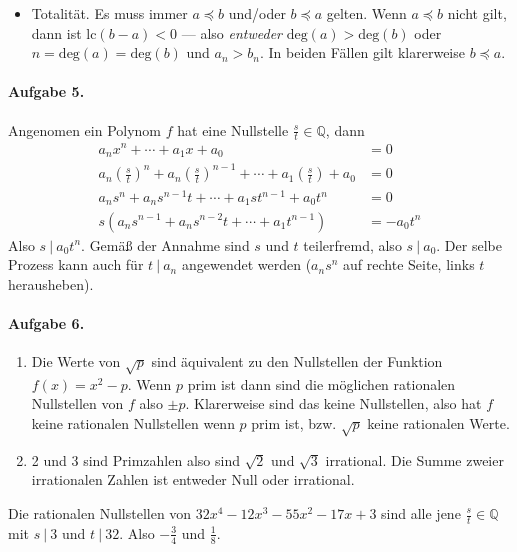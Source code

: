 \documentclass{article}
\begin{document}
\begin{enumerate}
\begin{itemize}
        \item Totalität. Es muss immer $a \preccurlyeq b$ und/oder $b \preccurlyeq a$ gelten. Wenn $a \preccurlyeq b$ nicht gilt, dann ist $\text{lc}(b - a) < 0$ --- also \emph{entweder} $\text{deg}(a) > \text{deg}(b)$ oder $n = \text{deg}(a) = \text{deg}(b)$ und $a_n > b_n$. In beiden Fällen gilt klarerweise $b \preccurlyeq a$.
    \end{itemize}
\end{enumerate}

\paragraph{Aufgabe 5.} Angenomen ein Polynom $f$ hat eine Nullstelle $\frac{s}{t} \in \mathbb{Q}$, dann
\begin{align*}
    a_nx^n + \cdots + a_1x + a_0 &= 0 \\
    a_n\left(\frac{s}{t}\right)^n + a_n\left(\frac{s}{t}\right)^{n - 1} + \cdots + a_1\left(\frac{s}{t}\right) + a_0 &= 0 \\
    a_ns^n + a_ns^{n - 1}t + \cdots + a_1st^{n - 1} + a_0t^n &= 0 \\
    s\left(a_ns^{n - 1} + a_ns^{n - 2}t + \cdots + a_1t^{n - 1}\right) &= -a_0t^n
\end{align*}
Also $s\ |\ a_0t^n$. Gemäß der Annahme sind $s$ und $t$ teilerfremd, also $s\ |\ a_0$. Der selbe Prozess kann auch für $t\ |\ a_n$ angewendet werden ($a_ns^n$ auf rechte Seite, links $t$ herausheben).

\paragraph{Aufgabe 6.}
\begin{enumerate}
    \item Die Werte von $\sqrt{p}$ sind äquivalent zu den Nullstellen der Funktion $f(x) = x^2 - p$. Wenn $p$ prim ist dann sind die möglichen rationalen Nullstellen von $f$ also $\pm p$. Klarerweise sind das keine Nullstellen, also hat $f$ keine rationalen Nullstellen wenn $p$ prim ist, bzw. $\sqrt{p}$ keine rationalen Werte.
    
    \item 2 und 3 sind Primzahlen also sind $\sqrt{2}$ und $\sqrt{3}$ irrational. Die Summe zweier irrationalen Zahlen ist entweder Null oder irrational.
\end{enumerate}

Die rationalen Nullstellen von $32x^4 - 12x^3 - 55x^2 - 17x + 3$ sind alle jene $\frac{s}{t} \in \mathbb{Q}$ mit $s\ |\ 3$ und $t\ |\ 32$. Also $-\frac{3}{4}$ und $\frac{1}{8}$.
\end{document}
